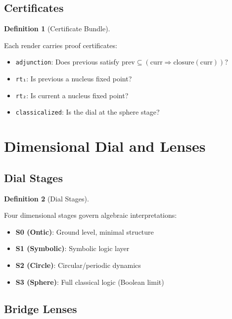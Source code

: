 \documentclass{amsart}
\theoremstyle{definition}
\newtheorem{definition}{Definition}[section]
\theoremstyle{remark}
\begin{document}
\subsection{Certificates}
\label{sec:certificates}

\begin{definition}[Certificate Bundle]
\label{def:certificates}
\uses{}

Each render carries proof certificates:
\begin{itemize}
\item \texttt{adjunction}: Does previous satisfy $\text{prev} \subseteq (\text{curr} \Rightarrow \text{closure}(\text{curr}))$?
\item \texttt{rt₁}: Is previous a nucleus fixed point?
\item \texttt{rt₂}: Is current a nucleus fixed point?
\item \texttt{classicalized}: Is the dial at the sphere stage?
\end{itemize}
\end{definition}

\section{Dimensional Dial and Lenses}

\subsection{Dial Stages}
\label{sec:dial-stages}

\begin{definition}[Dial Stages]
\label{def:dial-stages}
\uses{}

Four dimensional stages govern algebraic interpretations:
\begin{itemize}
\item \textbf{S0 (Ontic)}: Ground level, minimal structure
\item \textbf{S1 (Symbolic)}: Symbolic logic layer
\item \textbf{S2 (Circle)}: Circular/periodic dynamics
\item \textbf{S3 (Sphere)}: Full classical logic (Boolean limit)
\end{itemize}
\end{definition}

\subsection{Bridge Lenses}
\label{sec:lenses}
\end{document}
